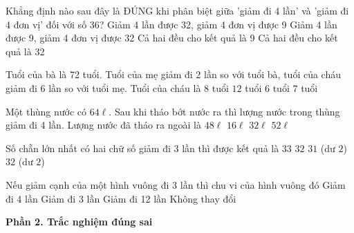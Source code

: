 \begin{ex} %
Khẳng định nào sau đây là ĐÚNG khi phân biệt giữa 'giảm đi 4 lần' và 'giảm đi 4 đơn vị' đối với số 36?
\choice
{Giảm 4 lần được 32, giảm 4 đơn vị được 9}
{\True Giảm 4 lần được 9, giảm 4 đơn vị được 32}
{Cả hai đều cho kết quả là 9}
{Cả hai đều cho kết quả là 32}
\end{ex}

\begin{ex} %
Tuổi của bà là 72 tuổi. Tuổi của mẹ giảm đi 2 lần so với tuổi bà, tuổi của cháu giảm đi 6 lần so với tuổi mẹ. Tuổi của cháu là
\choice
{$8$ tuổi}
{$12$ tuổi}
{\True $6$ tuổi}
{$7$ tuổi}
\end{ex}

\begin{ex} %
Một thùng nước có $64\ell$. Sau khi tháo bớt nước ra thì lượng nước trong thùng giảm đi 4 lần. Lượng nước đã tháo ra ngoài là
\choice
{\True $48\ell$}
{$16\ell$}
{$32\ell$}
{$52\ell$}
\end{ex}

\begin{ex} %
Số chẵn lớn nhất có hai chữ số giảm đi 3 lần thì được kết quả là
\choice
{$33$}
{$32$}
{$31$ (dư $2$)}
{\True $32$ (dư $2$)}
\end{ex}

\begin{ex} %
Nếu giảm cạnh của một hình vuông đi 3 lần thì chu vi của hình vuông đó
\choice
{Giảm đi 4 lần}
{\True Giảm đi 3 lần}
{Giảm đi 12 lần}
{Không thay đổi}
\end{ex}

\textbf{Phần 2. Trắc nghiệm đúng sai}

